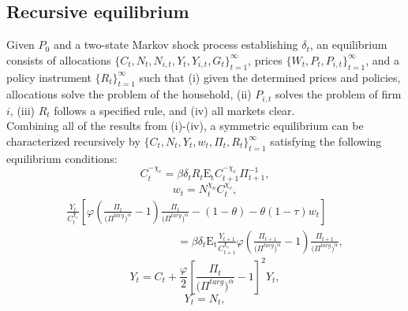 \documentclass[11pt]{article}
\begin{document}
\begin{singlespace}
		\subsection{Recursive equilibrium}
		
		\normalsize{Given \(P_{0}\) and a two-state Markov shock process establishing \(\delta_{t}\), an equilibrium consists of allocations \(\{C_{t},N_{t},N_{i,t},Y_{t},Y_{i,t},G_{t}\}_{t=1}^{\infty}\), prices \(\{W_{t},P_{t},P_{i,t}\}_{t=1}^{\infty}\), and a policy instrument \(\{R_{t}\}_{t=1}^{\infty}\) such that (i) given the determined prices and policies, allocations solve the problem of the household, (ii) \(P_{i,t}\) solves the problem of firm \(i\), (iii) \(R_{t}\) follows a specified rule, and (iv) all markets clear.}\\
		
		\normalsize{Combining all of the results from (i)-(iv), a symmetric equilibrium can be characterized recursively by \(\{C_{t},N_{t},Y_{t},w_{t},\Pi_{t},R_{t}\}^{\infty}_{t=1}\) satisfying the following equilibrium conditions:}
		\begin{equation}
			C_{t}^{-\chi_{c}} = \beta\delta_{t}R_{t}\mathrm{E_{t}}C_{t+1}^{-\chi_{c}}\Pi_{t+1}^{-1},\label{eq:CEE_a}
		\end{equation}
		\begin{equation}
			w_{t}=N_{t}^{\chi_{n}}C_{t}^{\chi_{c}},\label{eq:IOC_a}
		\end{equation}
		\begin{equation}
			\begin{multlined}
				\frac{Y_{t}}{C_{t}^{\chi_{c}}}\left[\varphi \left(\frac{\Pi_{t}}{\bigl(\Pi^{targ}\bigr)^{\alpha}}-1\right)\frac{\Pi_{t}}{\bigl(\Pi^{targ}\bigr)^{\alpha}} - (1-\theta)-\theta (1-\tau)w_{t}\right]\\
				\hspace{10em}=
				\beta\delta_{t}\mathrm{E_{t}}\frac{Y_{t+1}}{C_{t+1}^{\chi_{c}}}\varphi \left(\frac{\Pi_{t+1}}{\bigl(\Pi^{targ}\bigr)^{\alpha}}-1\right)\frac{\Pi_{t+1}}{\bigl(\Pi^{targ}\bigr)^{\alpha}},\label{eq:FLPC_a}
			\end{multlined}
		\end{equation}
		\begin{equation}
			Y_{t} = C_{t} + \frac{\varphi}{2}\left[\frac{\Pi_{t}}{\bigl(\Pi^{targ}\bigr)^{\alpha}}-1\right]^{2}Y_{t},\label{eq:ARC_a}
		\end{equation}
		\begin{equation}
			Y_{t}=N_{t}, \label{eq:APF_a}
		\end{equation}

\end{singlespace}
\end{document}
